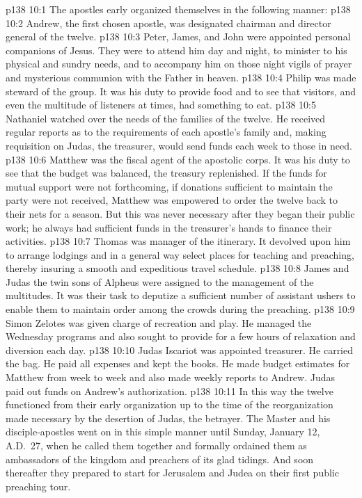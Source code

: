 \vs p138 10:1 The apostles early organized themselves in the following manner:
\pc \vs p138 10:2 \bibnobreakspace Andrew, the first chosen apostle, was designated chairman and director general of the twelve.
\pc \vs p138 10:3 \bibnobreakspace Peter, James, and John were appointed personal companions of Jesus. They were to attend him day and night, to minister to his physical and sundry needs, and to accompany him on those night vigils of prayer and mysterious communion with the Father in heaven.
\pc \vs p138 10:4 \bibnobreakspace Philip was made steward of the group. It was his duty to provide food and to see that visitors, and even the multitude of listeners at times, had something to eat.
\pc \vs p138 10:5 \bibnobreakspace Nathaniel watched over the needs of the families of the twelve. He received regular reports as to the requirements of each apostle’s family and, making requisition on Judas, the treasurer, would send funds each week to those in need.
\pc \vs p138 10:6 \bibnobreakspace Matthew was the fiscal agent of the apostolic corps. It was his duty to see that the budget was balanced, the treasury replenished. If the funds for mutual support were not forthcoming, if donations sufficient to maintain the party were not received, Matthew was empowered to order the twelve back to their nets for a season. But this was never necessary after they began their public work; he always had sufficient funds in the treasurer’s hands to finance their activities.\plusone
\pc \vs p138 10:7 \bibnobreakspace Thomas was manager of the itinerary. It devolved upon him to arrange lodgings and in a general way select places for teaching and preaching, thereby insuring a smooth and expeditious travel schedule.
\pc \vs p138 10:8 \bibnobreakspace James and Judas the twin sons of Alpheus were assigned to the management of the multitudes. It was their task to deputize a sufficient number of assistant ushers to enable them to maintain order among the crowds during the preaching.
\pc \vs p138 10:9 \bibnobreakspace Simon Zelotes was given charge of recreation and play. He managed the Wednesday programs and also sought to provide for a few hours of relaxation and diversion each day.
\pc \vs p138 10:10 \bibnobreakspace Judas Iscariot was appointed treasurer. He carried the bag. He paid all expenses and kept the books. He made budget estimates for Matthew from week to week and also made weekly reports to Andrew. Judas paid out funds on Andrew’s authorization.
\pc \vs p138 10:11 In this way the twelve functioned from their early organization up to the time of the reorganization made necessary by the desertion of Judas, the betrayer. The Master and his disciple\hyp{}apostles went on in this simple manner until Sunday, January 12, A.D.~27, when he called them together and formally ordained them as ambassadors of the kingdom and preachers of its glad tidings. And soon thereafter they prepared to start for Jerusalem and Judea on their first public preaching tour.
